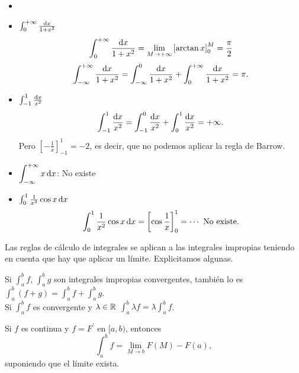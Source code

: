 \begin{example*}
    \begin{itemize}
        \item[]
        \item $\int^{+\infty}_0 \frac{\dif x}{1+x^2}$
            \[
                \int^{+\infty}_0 \frac{\dif x}{1+x^2} =
                \lim_{M \to +\infty} \left[\arctan x\right]^M_0 =
                \frac{\pi}{2}
            \]
            \[
                \int^{+\infty}_{-\infty} \frac{\dif x}{1+x^2} =
                \int^0_{-\infty} \frac{\dif x}{1+x^2} +
                \int^{+\infty}_0 \frac{\dif x}{1+x^2} = \pi.
            \]
        \item $\int^1_{-1} \frac{\dif x}{x^2}$
            \[
                \int^1_{-1} \frac{\dif x}{x^2} = \int^0_{-1}
                \frac{\dif x}{x^2} + \int^1_0 \frac{\dif x}{x^2} =
                +\infty.
            \]
            Pero $\left[-\frac{1}{x}\right]^1_{-1} = -2$, es decir, que no
            podemos aplicar la regla de Barrow.
        \item $\displaystyle \int^{+\infty}_{-\infty} x\dif x$: No existe
        \item $\int^1_0 \frac{1}{x^2}\cos x \dif x$
            \[
                \int^1_0 \frac{1}{x^2}\cos x \dif x =
                \left[ \cos \frac{1}{x} \right]^1_0 = \cdots
                \text{ No existe.}
            \]
    \end{itemize}
\end{example*}

\begin{obs}
    Las reglas de cálculo de integrales se aplican a las integrales impropias
    teniendo en cuenta que hay que aplicar un límite. Explicitamos algunas.
\end{obs}

\begin{prop}[Linealidad]
    Si $\int^b_a f$, $\int^b_a g$ son integrales impropias convergentes, tambi\'en
    lo es $\int^b_a (f+g) = \int^b_a f + \int^b_a g$.
    \\
    Si $\int^b_a f$ es convergente y $\lambda \in \mathbb{R}$ $\int^b_a \lambda f =
    \lambda \int^b_a f$.
\end{prop}

\begin{prop}
    Si $f$ es continua y $f = F^\prime$ en $[a,b)$, entonces
    \[
        \int^b_a f = \lim_{M \to b} F(M) - F(a),
    \]
    suponiendo que el límite exista.
\end{prop}

